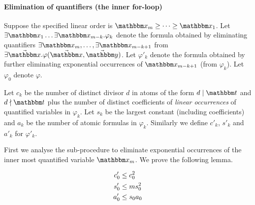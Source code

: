 \paragraph{Elimination of quantifiers (the inner for-loop)}
Suppose the specified linear order is $\ivarx_m\ge \dots \ge \ivarx_1$. Let $\exists \ivarx_1\dots \exists\ivarx_{m-k}.\varphi_k$ denote the formula obtained by eliminating quantifiers $\exists \ivarx_m,\dots,\exists\ivarx_{m-k+1}$ from $\exists \vec{\ivarx}. \varphi(\vec{\ivarx},\vec{\ivary})$. Let $\varphi'_k$ denote the formula obtained by further eliminating exponential occurrences of $\ivarx_{m-k+1}$ (from $\varphi_k$). Let $\varphi_0$ denote $\varphi$.

Let $c_k$ be the number of distinct divisor $d$ in atoms of the form $d \mid \iterm$ and $d \nmid \iterm$ plus the number of distinct coefficients of \emph{linear occurrences} of quantified variables in $\varphi_k$. Let $s_k$ be the largest constant (including coefficients) and $a_k$ be the number of atomic formulas in $\varphi_k$. Similarly we define $c'_k$, $s'_k$ and $a'_k$ for $\varphi'_k$.

First we analyse the sub-procedure to eliminate exponential occurrences of the inner most quantified variable $\ivarx_m$. We prove the following lemma.

\begin{lemma}\label{lem:cpx exp}
    \begin{align}
        c'_0&\le c_0^2 \notag \\
        s'_0&\le ms_0^2 \notag\\
        a'_0&\le s_0a_0\notag 
    \end{align} 
\end{lemma}

